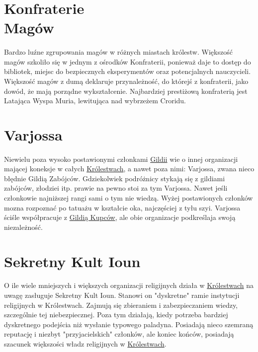 \documentclass[10pt,twoside,twocolumn]{book}
\begin{document}
\section[Konfraterie Magów]{Konfraterie\\Magów}
\paragraph{}
Bardzo luźne zgrupowania magów w różnych miastach królestw.
Większość magów szkoliło się w jednym z ośrodków Konfraterii, ponieważ daje to dostęp do bibliotek, miejsc do bezpiecznych eksperymentów oraz potencjalnych nauczycieli.
Większość magów z dumą deklaruje przynależność, do którejś z konfraterii, jako dowód, że mają porządne wykształcenie.
Najbardziej prestiżową konfraterią jest Latająca Wyspa Muria, lewitująca nad wybrzeżem Croridu.

\label{Varjossa}
\section{Varjossa}
\paragraph{}
Niewielu poza wysoko postawionymi członkami \hyperref[GildiaKupcow]{Gildii} wie o innej organizacji mającej koneksje w całych \hyperref[SojuczniczeKrolestwa]{Królestwach}, a nawet poza nimi: Varjossa, zwana nieco błędnie Gildią Zabójców.
Gdziekolwiek podróżnicy stykają się z gildiami zabójców, złodziei itp. prawie na pewno stoi za tym Varjossa.
Nawet jeśli członkowie najniższej rangi sami o tym nie wiedzą.
Wyżej postawionych członków mozna rozpoznać po tatuażu w kształcie oka, najczęściej z tyłu szyi.
Varjossa ściśle współpracuje z \hyperref[GildiaKupcow]{Gildią Kupców}, ale obie organizacje podkreślaja swoją niezależność.

\label{KultIoun}
\section{Sekretny Kult Ioun}
\paragraph{}
O ile wiele mniejszych i większych organizacji religijnych działa w \hyperref[SojuszniczeKrolestwa]{Królestwach} na uwagę zasługuje Sekretny Kult Ioun.
Stanowi on "dyskretne" ramie instytucji religijnych w Królestwach.
Zajmują się zbieraniem i zabezpieczaniem wiedzy, szczególnie tej niebezpiecznej.
Poza tym działają, kiedy potrzeba bardziej dyskretnego podejścia niż wysłanie typowego paladyna.
Posiadają nieco szemraną reputację i niezbyt "przyjacielskich" członków, ale koniec końców, posiadają szacunek większości władz religijnych w \hyperref[SojuszniczeKrolestwa]{Królestwach}.
\end{document}
